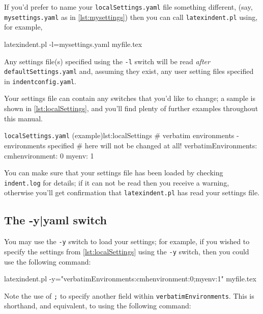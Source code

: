\documentclass[10pt]{article}
\begin{document}
 If you'd prefer to name your \texttt{localSettings.yaml} file something different, (say,
 \texttt{mysettings.yaml} as in \cref{lst:mysettings}) then you can call
 \texttt{latexindent.pl} using, for example,

 \begin{commandshell}
latexindent.pl -l=mysettings.yaml myfile.tex
\end{commandshell}

 Any settings file(s) specified using the \texttt{-l} switch will be read \emph{after}
 \texttt{defaultSettings.yaml} and, assuming they exist, any user setting files specified
 in \texttt{indentconfig.yaml}.

 Your settings file can contain any switches that you'd like to change; a sample is shown
 in \cref{lst:localSettings}, and you'll find plenty of further examples throughout this
 manual. 

 \begin{yaml}{\texttt{localSettings.yaml} (example)}{lst:localSettings}
#  verbatim environments - environments specified
#  here will not be changed at all!
verbatimEnvironments:
    cmhenvironment: 0
    myenv: 1
\end{yaml}

 You can make sure that your settings file has been loaded by checking
 \texttt{indent.log} for details; if it can not be read then you receive a warning,
 otherwise you'll get confirmation that \texttt{latexindent.pl} has read your settings
 file.

\subsection{The -y|yaml switch}\label{sec:yamlswitch}
 You%
 may use the \texttt{-y} switch to load your settings;  for example, if you wished to
 specify the settings from \cref{lst:localSettings} using the \texttt{-y} switch, then you
 could use the following command:

 \begin{commandshell}
latexindent.pl -y="verbatimEnvironments:cmhenvironment:0;myenv:1" myfile.tex
\end{commandshell}

 Note the use of \texttt{;} to specify another field within
 \texttt{verbatimEnvironments}. This is shorthand, and equivalent, to using the following
 command: 
\end{document}

